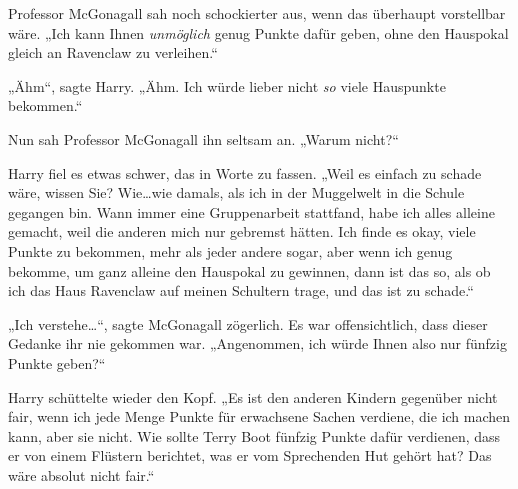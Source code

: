 Professor McGonagall sah noch schockierter aus, wenn das überhaupt vorstellbar wäre. „Ich kann Ihnen \emph{unmöglich} genug Punkte dafür geben, ohne den Hauspokal gleich an Ravenclaw zu verleihen.“


„Ähm“, sagte Harry. „Ähm. Ich würde lieber nicht \emph{so} viele Hauspunkte bekommen.“

Nun sah Professor McGonagall ihn seltsam an. „Warum nicht?“

Harry fiel es etwas schwer, das in Worte zu fassen. „Weil es einfach zu schade wäre, wissen Sie? Wie…wie damals, als ich in der Muggelwelt in die Schule gegangen bin. Wann immer eine Gruppenarbeit stattfand, habe ich alles alleine gemacht, weil die anderen mich nur gebremst hätten. Ich finde es okay, viele Punkte zu bekommen, mehr als jeder andere sogar, aber wenn ich genug bekomme, um ganz alleine den Hauspokal zu gewinnen, dann ist das so, als ob ich das Haus Ravenclaw auf meinen Schultern trage, und das ist zu schade.“

„Ich verstehe…“, sagte McGonagall zögerlich. Es war offensichtlich, dass dieser Gedanke ihr nie gekommen war. „Angenommen, ich würde Ihnen also nur fünfzig Punkte geben?“

Harry schüttelte wieder den Kopf. „Es ist den anderen Kindern gegenüber nicht fair, wenn ich jede Menge Punkte für erwachsene Sachen verdiene, die ich machen kann, aber sie nicht. Wie sollte Terry Boot fünfzig Punkte dafür verdienen, dass er von einem Flüstern berichtet, was er vom Sprechenden Hut gehört hat? Das wäre absolut nicht fair.“

